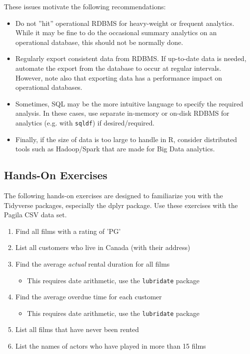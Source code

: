 \noindent These issues motivate the following recommendations:
\begin{itemize}
 \item Do not ''hit'' operational RDBMS for heavy-weight or frequent analytics. While it may be fine to do the occasional summary analytics on an operational database, this should not be normally done. 
 \item Regularly export consistent data from RDBMS. If up-to-date data is needed, automate the export from the database to occur at regular intervals. However, note also that exporting data has a performance impact on operational databases. 
 \item Sometimes, SQL may be the more intuitive language to specify the required analysis. In these cases, use separate in-memory or on-disk RDBMS for analytics (e.g. with \texttt{sqldf}) if desired/required. 
 \item Finally, if the size of data is too large to handle in R, consider distributed tools such as Hadoop/Spark that are made for Big Data analytics.
\end{itemize}

\begin{tcolorbox}[colback=code]
\subsection*{Hands-On Exercises}

The following hands-on exercises are designed to familiarize you with the Tidyverse packages, especially the dplyr package. Use these exercises with the Pagila CSV data set.

\begin{enumerate}[nosep]
  \item Find all films with a rating of 'PG'
  \item List all customers who live in Canada (with their address)
  \item Find the average \emph{actual} rental duration for all films
  \begin{itemize}
     \item This requires date arithmetic, use the \texttt{lubridate} package
  \end{itemize}
  \item Find the average overdue time for each customer
  \begin{itemize}
     \item This requires date arithmetic, use the \texttt{lubridate} package
  \end{itemize}
  \item List all films that have never been rented
  \item List the names of actors who have played in more than 15 films
\end{enumerate}
\end{tcolorbox}

